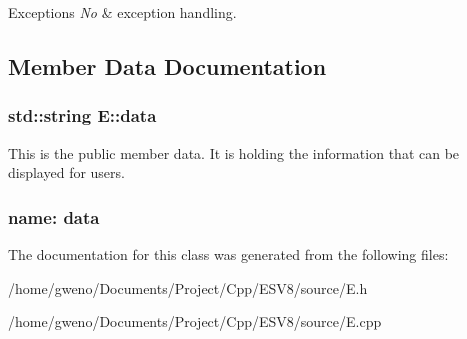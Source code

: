 \begin{DoxyExceptions}{Exceptions}
{\em No} & exception handling. \\
\hline
\end{DoxyExceptions}


\subsection{Member Data Documentation}
\subsubsection[{\texorpdfstring{data}{data}}]{\setlength{\rightskip}{0pt plus 5cm}std\+::string E\+::data}\hypertarget{classE_ae199dfce04c109f23799a5708a14a74a}{}\label{classE_ae199dfce04c109f23799a5708a14a74a}


This is the public member \textquotesingle{}data\textquotesingle{}. It is holding the information that can be displayed for users. 

\subsubsection*{name\+: data}

The documentation for this class was generated from the following files\+:\begin{DoxyCompactItemize}
\item 
/home/gweno/\+Documents/\+Project/\+Cpp/\+E\+S\+V8/source/E.\+h\item 
/home/gweno/\+Documents/\+Project/\+Cpp/\+E\+S\+V8/source/E.\+cpp\end{DoxyCompactItemize}
